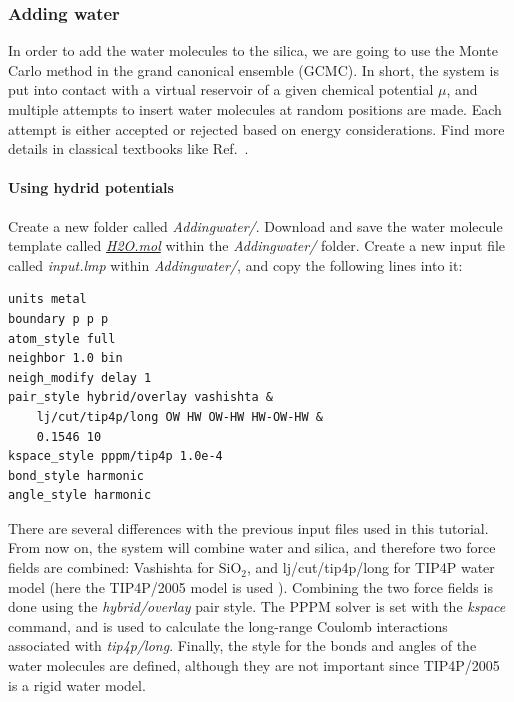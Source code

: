 \documentclass[9pt,tutorial]{livecoms}
\begin{document}
\subsubsection{Adding water}
\noindent In order to add the water molecules to the silica, we are going to use
the Monte Carlo method in the grand canonical ensemble (GCMC). In short, the
system is put into contact with a virtual reservoir of a given chemical potential
$\mu$, and multiple attempts to insert water molecules at random positions are
made. Each attempt is either accepted or rejected based on energy considerations.
Find more details in classical textbooks like Ref.~.

\paragraph{Using hydrid potentials}
\noindent Create a new folder called \textit{Addingwater/}. Download and save
the water molecule template called
\href{https://raw.githubusercontent.com/lammpstutorials/lammpstutorials-article/main/files/tutorial6/H2O.mol}{\textit{H2O.mol}}
within the \textit{Addingwater/} folder. Create a new input file called \textit{input.lmp}
within \textit{Addingwater/}, and copy the following lines into it:
\begin{lstlisting}
units metal
boundary p p p
atom_style full
neighbor 1.0 bin
neigh_modify delay 1
pair_style hybrid/overlay vashishta &
    lj/cut/tip4p/long OW HW OW-HW HW-OW-HW &
    0.1546 10
kspace_style pppm/tip4p 1.0e-4
bond_style harmonic
angle_style harmonic
\end{lstlisting}
There are several differences with the previous input files used in this tutorial.
From now on, the system will combine water and silica, and therefore two force
fields are combined: Vashishta for $\text{SiO}_2$, and lj/cut/tip4p/long for
TIP4P water model (here the TIP4P/2005 model is used \cite{abascal2005general}).
Combining the two force fields is done using the \textit{hybrid/overlay} pair
style. The PPPM solver \cite{luty1996calculating} is set with the \textit{kspace}
command, and is used to calculate the long-range Coulomb interactions associated
with \textit{tip4p/long}. Finally, the style for the bonds
and angles of the water molecules are defined, although they are not important
since TIP4P/2005 is a rigid water model.
\end{document}
